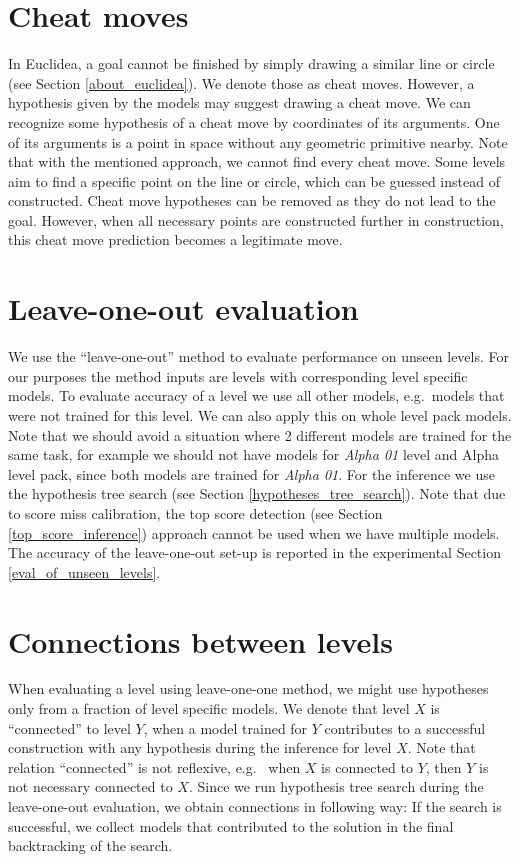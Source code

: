 \section{Cheat moves}
In Euclidea, a goal cannot be finished by simply drawing a similar line or circle (see Section \ref{about_euclidea}). We denote those as cheat moves. However, a hypothesis given by the models may suggest drawing a cheat move. We can recognize some hypothesis of a cheat move by coordinates of its arguments. One of its arguments is a point in space without any geometric primitive nearby. Note that with the mentioned approach, we cannot find every cheat move. Some levels aim to find a specific point on the line or circle, which can be guessed instead of constructed. Cheat move hypotheses can be removed as they do not lead to the goal. However, when all necessary points are constructed further in construction, this cheat move prediction becomes a legitimate move.

\section{Leave-one-out evaluation}
\label{leave_one_out_method}
We use the ``leave-one-out'' method to evaluate performance on unseen levels. For our purposes the method inputs are levels with corresponding level specific models. To evaluate accuracy of a level we use all other models, e.g.~models that were not trained for this level. We can also apply this on whole level pack models. Note that we should avoid a situation where 2 different models are trained for the same task, for example we should not have models for \textit{Alpha 01} level and Alpha level pack, since both models are trained for \textit{Alpha 01}. For the inference we use the hypothesis tree search (see Section \ref{hypotheses_tree_search}).
Note that due to score miss calibration, the top score detection (see Section \ref{top_score_inference}) approach cannot be used when we have multiple models. The accuracy of the leave-one-out set-up is reported in the experimental Section \ref{eval_of_unseen_levels}.

\section{Connections between levels}
\label{connections}
When evaluating a level using leave-one-one method, we might use hypotheses only from a fraction of level specific models. We denote that level $X$ is ``connected'' to level $Y$, when a model trained for $Y$ contributes to a successful construction with any hypothesis during the inference for level $X$. Note that relation ``connected'' is not reflexive, e.g.~ when $X$ is connected to $Y$, then $Y$ is not necessary connected to $X$. Since we run hypothesis tree search during the leave-one-out evaluation, we obtain connections in following way: If the search is successful, we collect models that contributed to the solution in the final backtracking of the search.


